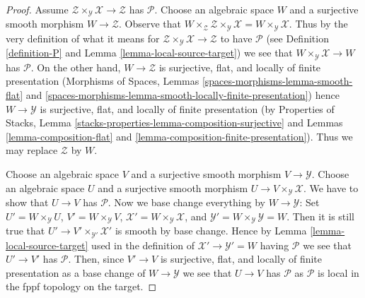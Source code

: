 \documentclass[10pt,a4paper]{amsart}
\theoremstyle{plain}
\theoremstyle{definition}
\theoremstyle{remark}
\numberwithin{equation}{subsection}
\begin{document}
\begin{proof}
Assume $\mathcal{Z} \times_\mathcal{Y} \mathcal{X} \to \mathcal{Z}$
has $\mathcal{P}$. Choose an algebraic space $W$ and a surjective
smooth morphism $W \to \mathcal{Z}$. Observe that
$W \times_\mathcal{Z} \mathcal{Z} \times_\mathcal{Y} \mathcal{X} =
W \times_\mathcal{Y} \mathcal{X}$. Thus by the very definition of
what it means for $\mathcal{Z} \times_\mathcal{Y} \mathcal{X} \to \mathcal{Z}$
to have $\mathcal{P}$ (see Definition \ref{definition-P}
and Lemma \ref{lemma-local-source-target})
we see that $W \times_\mathcal{Y} \mathcal{X} \to W$
has $\mathcal{P}$. On the other hand, $W \to \mathcal{Z}$
is surjective, flat, and locally of finite presentation
(Morphisms of Spaces, Lemmas
\ref{spaces-morphisms-lemma-smooth-flat} and
\ref{spaces-morphisms-lemma-smooth-locally-finite-presentation})
hence $W \to \mathcal{Y}$ is surjective, flat, and locally of finite
presentation (by
Properties of Stacks, Lemma
\ref{stacks-properties-lemma-composition-surjective}
and
Lemmas \ref{lemma-composition-flat} and
\ref{lemma-composition-finite-presentation}).
Thus we may replace $\mathcal{Z}$ by $W$.

\medskip\noindent
Choose an algebraic space $V$ and a surjective smooth morphism
$V \to \mathcal{Y}$. Choose an algebraic space $U$ and a surjective
smooth morphism $U \to V \times_\mathcal{Y} \mathcal{X}$.
We have to show that $U \to V$ has $\mathcal{P}$.
Now we base change everything by $W \to \mathcal{Y}$: Set
$U' = W \times_\mathcal{Y} U$,
$V' = W \times_\mathcal{Y} V$,
$\mathcal{X}' = W \times_\mathcal{Y} \mathcal{X}$,
and $\mathcal{Y}' = W \times_\mathcal{Y} \mathcal{Y} = W$.
Then it is still true that $U' \to V' \times_{\mathcal{Y}'} \mathcal{X}'$
is smooth by base change. Hence by Lemma \ref{lemma-local-source-target}
used in the definition of $\mathcal{X}' \to \mathcal{Y}' = W$
having $\mathcal{P}$ we see that $U' \to V'$ has $\mathcal{P}$.
Then, since $V' \to V$ is surjective, flat, and locally of finite presentation
as a base change of $W \to \mathcal{Y}$ we see that $U \to V$
has $\mathcal{P}$ as $\mathcal{P}$ is local in the fppf topology
on the target.
\end{proof}
\end{document}
